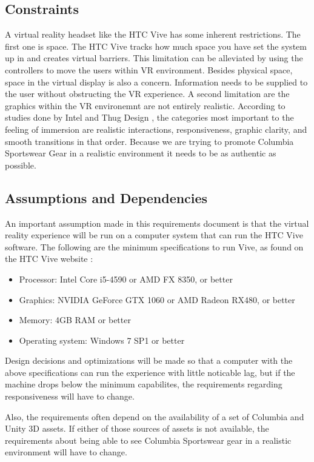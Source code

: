 \documentclass[10pt,journal,compsoc,onecolumn, draftclsnofoot]{IEEEtran}
\begin{document}
\subsection{Constraints}
A virtual reality headset like the HTC Vive has some inherent restrictions.
The first one is space. The HTC Vive tracks how much space you have set the
system up in and creates virtual barriers. This limitation can be alleviated by
using the controllers to move the users within VR environment. Besides physical
space, space in the virtual display is also a concern. Information needs to be
supplied to the user without obstructing the VR experience. A second
limitation are the graphics within the VR environemnt are not entirely
realistic. According to studies done by Intel and Thug Design \cite{michalak_lind_round1}\cite{michalak_lind_round2}, the categories most
important to the feeling of immersion are realistic interactions, responsiveness,
graphic clarity, and smooth transitions in that order. Because we are trying to
promote Columbia Sportswear Gear in a realistic environment it needs to be as
authentic as possible.

\subsection{Assumptions and Dependencies}
An important assumption made in this requirements document is that the virtual
reality experience will be run on a computer system that can run the HTC Vive
software.  The following are the minimum specifications to run Vive, as found
on the HTC Vive website \cite{htc_vive_ready}:
\begin{itemize}
  \item Processor: Intel Core i5-4590 or AMD FX 8350, or better
  \item Graphics: NVIDIA GeForce GTX 1060 or AMD Radeon RX480, or better
  \item Memory: 4GB RAM or better
  \item Operating system: Windows 7 SP1 or better
\end{itemize}
Design decisions and optimizations will be made so that a computer with the
above specifications can run the experience with little noticable lag, but if
the machine drops below the minimum capabilites, the requirements regarding
responsiveness will have to change.

Also, the requirements often depend on the availability of a set of Columbia
and Unity 3D assets.  If either of those sources of assets is not available,
the requirements about being able to see Columbia Sportswear gear in a
realistic environment will have to change.
\end{document}
